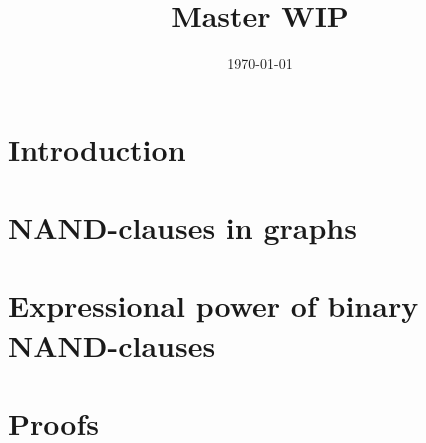 \documentclass[11pt, a4paper]{report}   	%
\title{Master WIP}
\author{\name}
\date{\today}
\theoremstyle{plain}
\theoremstyle{definition}
\begin{document}
	\maketitle
	\tableofcontents
  \chapter{Introduction}
  \label{chap:Introduction}
  
  
  
  
	
	
	
	
	\chapter{NAND-clauses in graphs}
	\label{chap:NAND-clauses in graphs}
	
	
	\chapter{Expressional power of binary NAND-clauses}
	\label{chap:Expressional power of binary NAND-clauses}
	
	
  \chapter{Proofs}
  \label{chap:Proofs}
  
	\pagebreak
	
	\pagebreak
	\printbibliography
\end{document}
